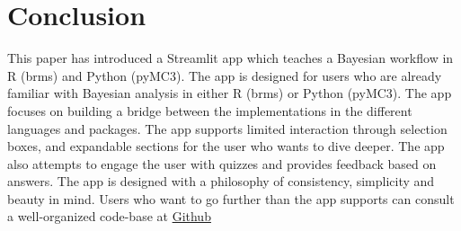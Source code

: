 \documentclass[12pt]{article}
\begin{document}
\section{Conclusion}
This paper has introduced a Streamlit app which teaches a Bayesian workflow in R (brms)
and Python (pyMC3). The app is designed for users who are already familiar with Bayesian
analysis in either R (brms) or Python (pyMC3). The app focuses on building a bridge
between the implementations in the different languages and packages.
The app supports limited interaction through selection boxes, and expandable
sections for the user who wants to dive deeper. The app also attempts to engage
the user with quizzes and provides feedback based on answers. The app is designed with
a philosophy of consistency, simplicity and beauty in mind. Users who want to
go further than the app supports can consult a well-organized code-base at
\href{https://github.com/victor-m-p/BayesWorkflow}{Github}
\printbibliography
\end{document}
